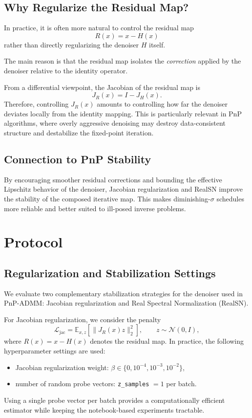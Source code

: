 \documentclass{article}
\begin{document}
\subsection{Why Regularize the Residual Map?}
In practice, it is often more natural to control the residual map
\begin{equation}
    R(x) = x - H(x)
\end{equation}
rather than directly regularizing the denoiser $H$ itself.

The main reason is that the residual map isolates the \emph{correction} applied by the denoiser relative to the identity operator.

From a differential viewpoint, the Jacobian of the residual map is
\begin{equation}
    J_R(x) = I - J_H(x).
\end{equation}
Therefore, controlling $J_R(x)$ amounts to controlling how far the denoiser deviates locally from the identity mapping.
This is particularly relevant in PnP algorithms, where overly aggressive denoising may destroy data-consistent structure and destabilize the fixed-point iteration.

\subsection{Connection to PnP Stability}
By encouraging smoother residual corrections and bounding the effective Lipschitz behavior of the denoiser, Jacobian regularization and RealSN improve the stability of the composed iterative map.
This makes diminishing-$\sigma$ schedules more reliable and better suited to ill-posed inverse problems.


\section{Protocol}

\subsection{Regularization and Stabilization Settings}
We evaluate two complementary stabilization strategies for the denoiser used in PnP-ADMM: Jacobian regularization and Real Spectral Normalization (RealSN).

For Jacobian regularization, we consider the penalty
\begin{equation}
    \mathcal{L}_{\mathrm{jac}}
    = \mathbb{E}_{x,z}\left[\|J_R(x)z\|_2^2\right],
    \qquad z \sim \mathcal{N}(0, I),
\end{equation}
where $R(x) = x - H(x)$ denotes the residual map.
In practice, the following hyperparameter settings are used:
\begin{itemize}
    \item Jacobian regularization weight: $\beta \in \{0, 10^{-4}, 10^{-3}, 10^{-2}\}$,
    \item number of random probe vectors: \texttt{z\_samples} $=1$ per batch.
\end{itemize}
Using a single probe vector per batch provides a computationally efficient estimator while keeping the notebook-based experiments tractable.
\end{document}
